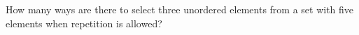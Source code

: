 \documentclass[../main.tex]{subfiles}
\begin{document}
How many ways are there to select three unordered elements from a set with five elements when repetition is allowed?

\solution
\end{document}
